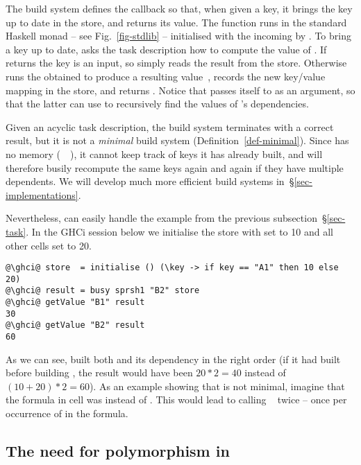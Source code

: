 \noindent
The  build system defines the callback  so that, when given a
key, it brings the key up to date in the store, and returns its value.
The function  runs in the standard Haskell  monad -- see
Fig.~\ref{fig-stdlib} -- initialised with the incoming  by .
To bring a key up to date,  asks the task description  how
to compute the value of . If  returns  the key is an
input, so  simply reads the result from the store. Otherwise 
runs the obtained  to produce a resulting value~, records the new
key/value mapping in the store, and returns . Notice that 
passes itself to  as an argument, so that the latter can use 
to recursively find the values of 's dependencies.

Given an acyclic task description, the  build system terminates with a
correct result, but it is not a \emph{minimal} build system
(Definition~\ref{def-minimal}). Since  has no memory
(~\hs{=}~\hs{()}), it cannot keep track of keys it has already built, and
will therefore busily recompute the same keys again and again if they have
multiple dependents. We will develop much more efficient build systems
in~\S\ref{sec-implementations}.

Nevertheless,  can easily handle the example 
from the previous subsection~\S\ref{sec-task}. In the GHCi session below we
initialise the store with  set to 10 and all other cells set to 20.

\begin{verbatim}
@\ghci@ store  = initialise () (\key -> if key == "A1" then 10 else 20)
@\ghci@ result = busy sprsh1 "B2" store
@\ghci@ getValue "B1" result
30
@\ghci@ getValue "B2" result
60
\end{verbatim}

\noindent
As we can see,  built both  and its dependency  in the
right order (if it had built  before building , the result would
have been $20 * 2 = 40$ instead of $(10 + 20) * 2 = 60$). As an example showing
that  is not minimal, imagine that the formula in cell  was
 instead of . This would lead to calling
~ twice -- once per occurrence of  in the
formula.

\subsection{The need for polymorphism in }\label{sec-why-polymorphism}
\vspace{-0.5mm}

